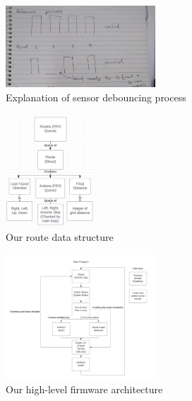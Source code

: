 \documentclass[conference]{IEEEtran}
\begin{document}
\begin{figure}[htbp]
	\centerline{\includegraphics[width=0.5\textwidth]{sensor-debouncing.png}}
	\caption{Explanation of sensor debouncing process}
	\label{fig:sensor-debouncing}
\end{figure}

\begin{figure}[htbp]
	\centerline{\includegraphics[width=0.3\textwidth]{pathfinding-route-struct.png}}
	\caption{Our route data structure}
	\label{fig:pathfinding-route-struct}
\end{figure}

\begin{figure}[htbp]
	\centerline{\includegraphics[width=0.5\textwidth]{integration-flowchart.png}}
	\caption{Our high-level firmware architecture}
	\label{fig:integration-flowchart}
\end{figure}
\end{document}
